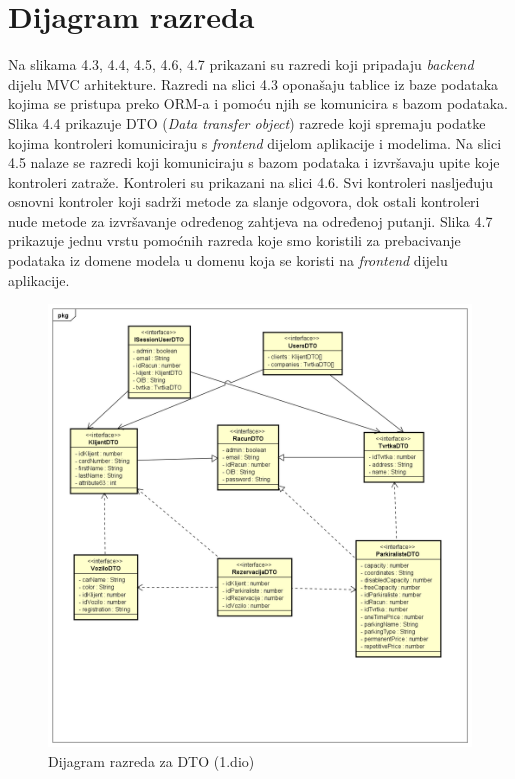 			\eject
			
			
		\section{Dijagram razreda}
		
		Na  slikama 4.3, 4.4, 4.5, 4.6, 4.7 prikazani su razredi koji pripadaju \textit{backend} dijelu MVC arhitekture. Razredi na slici 4.3 oponašaju tablice iz baze podataka kojima se pristupa preko ORM-a i pomoću njih se komunicira s bazom podataka. Slika 4.4 prikazuje DTO (\textit{Data transfer object}) razrede koji spremaju podatke kojima kontroleri komuniciraju s \textit{frontend} dijelom aplikacije i modelima. Na slici 4.5 nalaze se razredi koji komuniciraju s bazom podataka i izvršavaju upite koje kontroleri zatraže. Kontroleri su prikazani na slici 4.6. Svi kontroleri nasljeđuju osnovni kontroler koji sadrži metode za slanje odgovora, dok ostali kontroleri nude metode za izvršavanje određenog zahtjeva na određenoj putanji. Slika 4.7 prikazuje jednu vrstu pomoćnih razreda koje smo koristili za prebacivanje podataka iz domene modela u domenu koja se koristi na \textit{frontend} dijelu aplikacije.
		
		
    
    	\begin{figure}[H]
	    	\includegraphics[width=1\linewidth]{dijagrami/Dijagram razreda - DTO_1.png}
	    	\caption{Dijagram razreda za DTO (1.dio)}
	    	\label{fig:Dijagram razreda - DTO1} 
	   	 \end{figure}
	   	 
